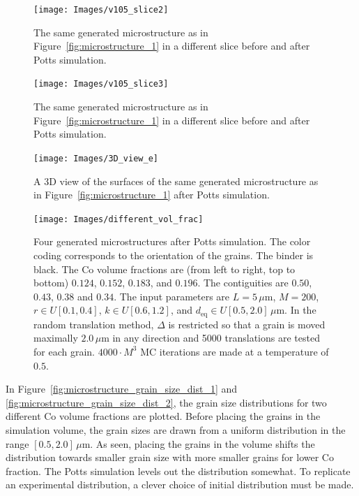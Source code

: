 \documentclass[10pt,a4paper]{article}
\begin{document}
\begin{figure}
	\begin{center}
		\texttt{[image: Images/v105\_slice2]}
	\end{center}
	\caption{The same generated microstructure as in Figure~\ref{fig:microstructure_1} in a different slice before and after Potts simulation.}
	\label{fig:microstructure_2}
\end{figure}

\begin{figure}
	\begin{center}
		\texttt{[image: Images/v105\_slice3]}
	\end{center}
	\caption{The same generated microstructure as in Figure~\ref{fig:microstructure_1} in a different slice before and after Potts simulation.}
	\label{fig:microstructure_3}
\end{figure}

\begin{figure}
	\begin{center}
		\texttt{[image: Images/3D\_view\_e]}
	\end{center}
	\caption{A 3D view of the surfaces of the same generated microstructure as in Figure~\ref{fig:microstructure_1} after Potts simulation.}
	\label{fig:microstructure_3d}
\end{figure}

\begin{figure}
	\begin{center}
		\texttt{[image: Images/different\_vol\_frac]}
	\end{center}
	\caption{Four generated microstructures after Potts simulation. The color coding corresponds to the orientation of the grains. The binder is black. The Co volume fractions are (from left to right, top to bottom) $0.124$, $0.152$, $0.183$, and $0.196$. The contiguities are $0.50$, $0.43$, $0.38$ and $0.34$. The input parameters are $L=5 \, \mu\text{m}$, $M=200$, $r \in U[0.1, 0.4]$, $k \in U[0.6, 1.2]$, and $d_\text{eq} \in U[0.5, 2.0] \, \mu\text{m}$. In the random translation method, $\Delta$ is restricted so that a grain is moved maximally $2.0 \, \mu \text{m}$ in any direction and 5000 translations are tested for each grain. $4000 \cdot M^3$ MC iterations are made at a temperature of $0.5$.}
	\label{fig:microstructure_diff_vol_frac}
\end{figure}

In Figure~\ref{fig:microstructure_grain_size_dist_1} and \ref{fig:microstructure_grain_size_dist_2}, the grain size distributions for two different Co volume fractions are plotted. Before placing the grains in the simulation volume, the grain sizes are drawn from a uniform distribution in the range $[0.5, 2.0] \, \mu\text{m}$. As seen, placing the grains in the volume shifts the distribution towards smaller grain size with more smaller grains for lower Co fraction. The Potts simulation levels out the distribution somewhat. To replicate an experimental distribution, a clever choice of initial distribution must be made.
\end{document}
